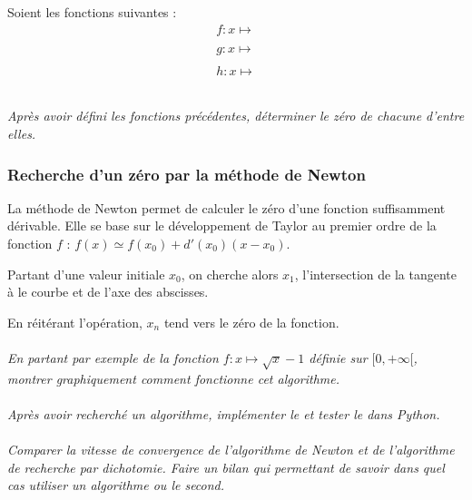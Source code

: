 \documentclass[11pt,oneside]{article}
\begin{document}
Soient les fonctions suivantes : 
$$ 
\begin{array}{l}
f:x \mapsto\\
\\
g:x \mapsto\\
\\
h:x \mapsto\\
\\
\end{array}
$$


\paragraph{}
\textit{Après avoir défini les fonctions précédentes, déterminer le zéro de chacune d'entre elles.}


\subsubsection*{Recherche d'un zéro par la méthode de Newton}
La méthode de Newton permet de calculer le zéro d'une fonction suffisamment dérivable. Elle se base sur le développement de Taylor au premier ordre de la fonction $f$ : $f(x)\simeq f(x_0)+d'(x_0)\left(x-x_0\right)$.

Partant d'une valeur initiale $x_0$, on cherche alors $x_1$, l'intersection de la tangente à le courbe et de l'axe des abscisses. 

En réitérant l'opération, $x_n$ tend vers le zéro de la fonction.

\paragraph{}
\textit{En partant par exemple de la fonction $f:x\mapsto \sqrt{x}-1$ définie sur $[0,+\infty[$, montrer graphiquement comment fonctionne cet algorithme.}

\paragraph{}
\textit{Après avoir recherché un algorithme, implémenter le et tester le dans Python.}


\paragraph{}
\textit{Comparer la vitesse de convergence de l'algorithme de Newton et de l'algorithme de recherche par dichotomie. Faire un bilan qui permettant de savoir dans quel cas utiliser un algorithme ou le second.}
\end{document}
